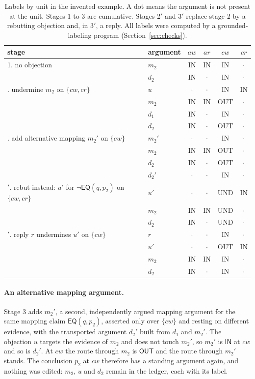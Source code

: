 \documentclass[11pt]{article}
\newcommand{\IN}{\textsf{IN}}
\newcommand{\UND}{\textsf{UND}}
\newcommand{\OUT}{\textsf{OUT}}
\newcommand{\EQ}{\mathsf{EQ}}
\newcommand{\nk}[1]{\neg#1}
\newcommand{\abs}{\cdot}
\begin{document}
\begin{table}[ht]
\centering
\small
\begin{tabular}{@{}llcccc@{}}
\toprule
stage & argument & $aw$ & $ar$ & $cw$ & $cr$\\
\midrule
1. no objection & $m_2$ & \IN & \IN & \IN & $\abs$\\
 & $d_2$ & \IN & $\abs$ & \IN & $\abs$\\
\addlinespace
2. undermine $m_2$ on $\{cw,cr\}$ & $u$ & $\abs$ & $\abs$ & \IN & \IN\\
 & $m_2$ & \IN & \IN & \OUT & $\abs$\\
 & $d_1$ & \IN & $\abs$ & \IN & $\abs$\\
 & $d_2$ & \IN & $\abs$ & \OUT & $\abs$\\
\addlinespace
3. add alternative mapping $m_2'$ on $\{cw\}$ & $m_2'$ & $\abs$ & $\abs$ & \IN & $\abs$\\
 & $m_2$ & \IN & \IN & \OUT & $\abs$\\
 & $d_2$ & \IN & $\abs$ & \OUT & $\abs$\\
 & $d_2'$ & $\abs$ & $\abs$ & \IN & $\abs$\\
\addlinespace
2$'$. rebut instead: $u'$ for $\nk{\EQ(q,p_2)}$ on $\{cw,cr\}$ & $u'$ & $\abs$ & $\abs$ & \UND & \IN\\
 & $m_2$ & \IN & \IN & \UND & $\abs$\\
 & $d_2$ & \IN & $\abs$ & \UND & $\abs$\\
\addlinespace
3$'$. reply $r$ undermines $u'$ on $\{cw\}$ & $r$ & $\abs$ & $\abs$ & \IN & $\abs$\\
 & $u'$ & $\abs$ & $\abs$ & \OUT & \IN\\
 & $m_2$ & \IN & \IN & \IN & $\abs$\\
 & $d_2$ & \IN & $\abs$ & \IN & $\abs$\\
\bottomrule
\end{tabular}
\caption{Labels by unit in the invented example. A dot means the argument is not present at the unit. Stages 1 to 3 are cumulative. Stages 2$'$ and 3$'$ replace stage 2 by a rebutting objection and, in 3$'$, a reply. All labels were computed by a grounded-labeling program (Section~\ref{sec:checks}).}\label{tab:stages}
\end{table}

\paragraph{An alternative mapping argument.} Stage 3 adds $m_2'$, a second, independently argued mapping argument for the same mapping claim $\EQ(q,p_2)$, asserted only over $\{cw\}$ and resting on different evidence, with the transported argument $d_2'$ built from $d_1$ and $m_2'$. The objection $u$ targets the evidence of $m_2$ and does not touch $m_2'$, so $m_2'$ is $\IN$ at $cw$ and so is $d_2'$. At $cw$ the route through $m_2$ is $\OUT$ and the route through $m_2'$ stands. The conclusion $p_2$ at $cw$ therefore has a standing argument again, and nothing was edited: $m_2$, $u$ and $d_2$ remain in the ledger, each with its label.
\end{document}
